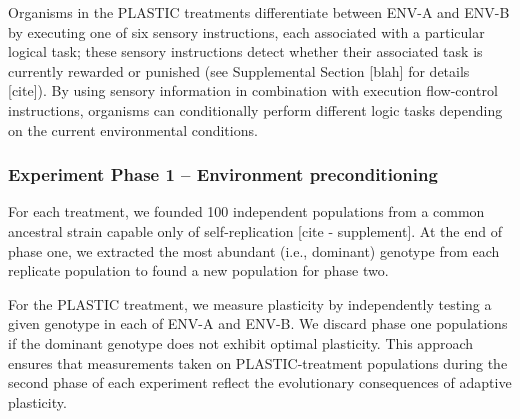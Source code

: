 Organisms in the PLASTIC treatments differentiate between ENV-A and ENV-B by executing one of six sensory instructions, each associated with a particular logical task; these sensory instructions detect whether their associated task is currently rewarded or punished (see Supplemental Section [blah] for details [cite]).
By using sensory information in combination with execution flow-control instructions, organisms can conditionally perform different logic tasks depending on the current environmental conditions.

\subsubsection{Experiment Phase 1 -- Environment preconditioning}
\label{sec:methods:experiment:phase-one}

For each treatment, we founded 100 independent populations from a common ancestral strain capable only of self-replication [cite - supplement].
At the end of phase one, we extracted the most abundant (i.e., dominant) genotype from each replicate population to found a new population for phase two.

For the PLASTIC treatment, we measure plasticity by independently testing a given genotype in each of ENV-A and ENV-B.
We discard phase one populations if the dominant genotype does not exhibit optimal plasticity.
This approach ensures that measurements taken on PLASTIC-treatment populations during the second phase of each experiment reflect the evolutionary consequences of adaptive plasticity.

